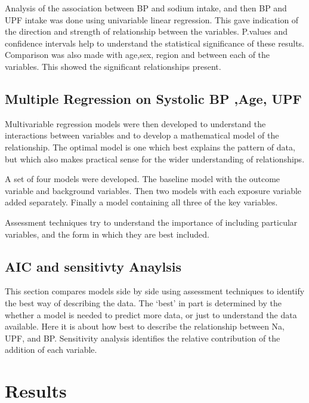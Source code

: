 \documentclass[
]{article}
\begin{document}
Analysis of the association between BP and sodium intake, and then BP
and UPF intake was done using univariable linear regression. This gave
indication of the direction and strength of relationship between the
variables. P.values and confidence intervals help to understand the
statistical significance of these results. Comparison was also made with
age,sex, region and between each of the variables. This showed the
significant relationships present.

\hypertarget{multiple-regression-on-systolic-bp-age-upf}{%
\subsection{Multiple Regression on Systolic BP ,Age,
UPF}\label{multiple-regression-on-systolic-bp-age-upf}}

Multivariable regression models were then developed to understand the
interactions between variables and to develop a mathematical model of
the relationship. The optimal model is one which best explains the
pattern of data, but which also makes practical sense for the wider
understanding of relationships.

A set of four models were developed. The baseline model with the outcome
variable and background variables. Then two models with each exposure
variable added separately. Finally a model containing all three of the
key variables.

Assessment techniques try to understand the importance of including
particular variables, and the form in which they are best included.

\hypertarget{aic-and-sensitivty-anaylsis}{%
\subsection{AIC and sensitivty
Anaylsis}\label{aic-and-sensitivty-anaylsis}}

This section compares models side by side using assessment techniques to
identify the best way of describing the data. The `best' in part is
determined by the whether a model is needed to predict more data, or
just to understand the data available. Here it is about how best to
describe the relationship between Na, UPF, and BP. Sensitivity analysis
identifies the relative contribution of the addition of each variable.

\newpage

\hypertarget{results}{%
\section{Results}\label{results}}
\end{document}

